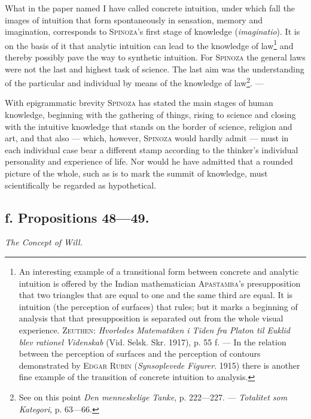 \documentclass[12pt]{article}
\begin{document}
What in the paper named I have called concrete intuition, under which fall the images of
intuition that form spontaneously in sensation, memory and imagination, corresponds to
\textsc{Spinoza}'s first stage of knowledge (\textit{imaginatio}). It is on the basis of it
that analytic intuition can lead to the knowledge of law\footnote{An interesting example of a
transitional form between concrete and analytic intuition is offered by the Indian
mathematician \textsc{Apastamba}'s presupposition that two triangles that are equal to one and
the same third are equal. It is intuition (the perception of surfaces) that rules; but it marks
a beginning of analysis that that presupposition is separated out from the whole visual
experience. \textsc{Zeuthen}: \textit{Hvorledes Matematiken i Tiden fra Platon til Euklid
blev rationel Videnskab} (Vid. Selsk. Skr. 1917), p. 55 f. --- In the relation between the
perception of surfaces and the perception of contours demonstrated by \textsc{Edgar Rubin}
(\textit{Synsoplevede Figurer}. 1915) there is another fine example of the transition of
concrete intuition to analysis.} and thereby possibly pave the way to synthetic intuition.
For \textsc{Spinoza} the general laws were not the last and highest task of science. The last
aim was the understanding of the particular and individual by means of the knowledge of
law\footnote{See on this point \textit{Den menneskelige Tanke}, p. 222---227. ---
\textit{Totalitet som Kategori}, p. 63---66.}. ---

With epigrammatic brevity \textsc{Spinoza} has stated the main stages of human knowledge,
beginning with the gathering of things, rising to science and closing with the intuitive
knowledge that stands on the border of science, religion and art, and that also --- which,
however, \textsc{Spinoza} would hardly admit --- must in each individual case bear a
different stamp according to the thinker's individual personality and experience of life. Nor
would he have admitted that a rounded picture of the whole, such as is to mark the summit of
knowledge, must scientifically be regarded as hypothetical.

\subsection*{f. Propositions 48---49.}
\begin{center}\textit{The Concept of Will.}\end{center}
\end{document}
